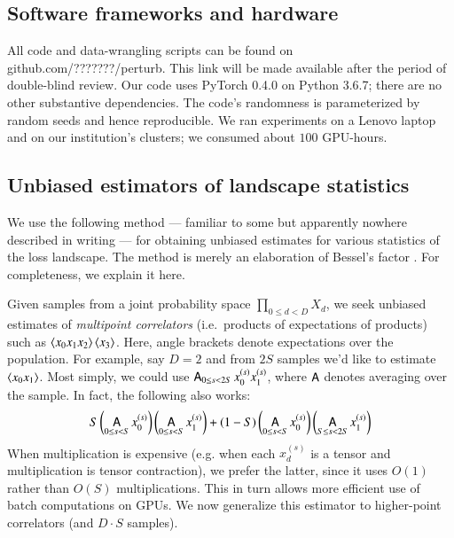     \subsection{Software frameworks and hardware}                   \label{appendix:frameworks}

        All code and data-wrangling scripts can be found on
        {\color{mooteal}github.com/???????/perturb}.  This link will be made
        available after the period of double-blind review.
        Our code uses PyTorch 0.4.0 \citep{pa19} on Python 3.6.7; there are no
        other substantive dependencies.  The code's randomness is parameterized
        by random seeds and hence reproducible.
        We ran experiments on a Lenovo laptop and on our institution's
        clusters; we consumed about $100$ GPU-hours.

    \subsection{Unbiased estimators of landscape statistics}        \label{appendix:bessel}
        We use the following method --- familiar to some but apparently nowhere
        described in writing --- for obtaining unbiased estimates for
        various statistics of the loss landscape.  The method is merely an
        elaboration of Bessel's factor \citep{ga23}.  For completeness, we
        explain it here. 
        
        Given samples from a joint probability space $\prod_{0\leq d<D} X_d$,
        we seek unbiased estimates of \emph{multipoint correlators} (i.e.\ products of
        expectations of products) such as $\left\langle x_0 x_1 x_2\right\rangle\left\langle x_3\right\rangle$.  Here,
        angle brackets denote expectations over the population. 
        For
        example, say $D=2$ and from $2S$ samples we'd like to estimate
        $\left\langle x_0 x_1\right\rangle$.  Most simply, we could use $\operatorname*{\text{\sffamily A}}_{0\leq s<2S}
        x_0^{(s)} x_1^{(s)}$, where $\operatorname*{\text{\sffamily A}}$ denotes averaging over the sample.  In fact, the
        following also works:
        \begin{equation} \label{eq:bessel}
            S
            \left(\operatorname*{\text{\sffamily A}}_{0\leq s< S} x_0^{(s)}\right)
            \left(\operatorname*{\text{\sffamily A}}_{0\leq s< S} x_1^{(s)}\right)
            +
            (1-S)
            \left(\operatorname*{\text{\sffamily A}}_{0\leq s< S} x_0^{(s)}\right)
            \left(\operatorname*{\text{\sffamily A}}_{S\leq s<2S} x_1^{(s)}\right)
        \end{equation}
        When multiplication is expensive (e.g. when each $x_d^{(s)}$ is a
        tensor and multiplication is tensor contraction), we prefer the latter,
        since it uses $O(1)$ rather than $O(S)$ multiplications.  This in turn
        allows more efficient use of batch computations on GPUs.  We now
        generalize this estimator to higher-point correlators (and $D\cdot S$
        samples).

